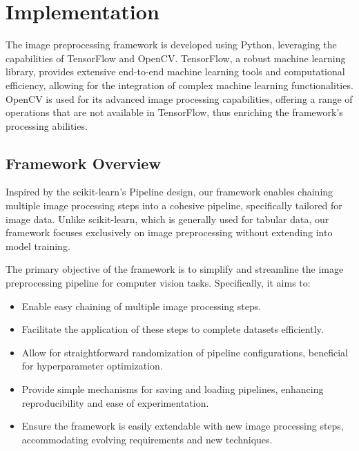 \documentclass[journal ]{new-aiaa}
\begin{document}
\section{Implementation}
The image preprocessing framework is developed using Python, leveraging the capabilities of TensorFlow and OpenCV. TensorFlow, a robust machine learning library, provides extensive end-to-end machine learning tools and computational efficiency, allowing for the integration of complex machine learning functionalities. OpenCV is used for its advanced image processing capabilities, offering a range of operations that are not available in TensorFlow, thus enriching the framework's processing abilities.

\subsection{Framework Overview}
Inspired by the scikit-learn's Pipeline design, our framework enables chaining multiple image processing steps into a cohesive pipeline, specifically tailored for image data. Unlike scikit-learn, which is generally used for tabular data, our framework focuses exclusively on image preprocessing without extending into model training.

The primary objective of the framework is to simplify and streamline the image preprocessing pipeline for computer vision tasks. Specifically, it aims to:
\begin{itemize}
    \item Enable easy chaining of multiple image processing steps.
    \item Facilitate the application of these steps to complete datasets efficiently.
    \item Allow for straightforward randomization of pipeline configurations, beneficial for hyperparameter optimization.
    \item Provide simple mechanisms for saving and loading pipelines, enhancing reproducibility and ease of experimentation.
    \item Ensure the framework is easily extendable with new image processing steps, accommodating evolving requirements and new techniques.
\end{itemize}
\end{document}
